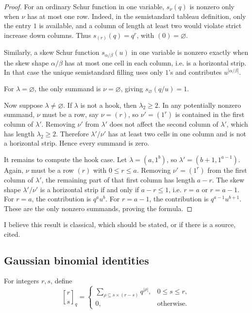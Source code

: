 \documentclass[12pt]{article}
\newcommand{\qbinom}[2]{\genfrac{[}{]}{0pt}{}{#1}{#2}_q}
\newcommand{\review}[1]{\begin{reviewbox}#1\end{reviewbox}}
\begin{document}
\begin{proof}
For an ordinary Schur function in one variable, \(s_\nu(q)\) is nonzero only when \(\nu\) has at most one row.  Indeed, in the semistandard tableau definition, only the entry \(1\) is available, and a column of length at least two would violate strict increase down columns.  Thus \(s_{(r)}(q)=q^r\), with \((0)=\varnothing\).

Similarly, a skew Schur function \(s_{\alpha/\beta}(u)\) in one variable is nonzero exactly when the skew shape \(\alpha/\beta\) has at most one cell in each column, i.e. is a horizontal strip.  In that case the unique semistandard filling uses only \(1\)'s and contributes \(u^{|\alpha/\beta|}\).

For \(\lambda=\varnothing\), the only summand is \(\nu=\varnothing\), giving \(s_{\varnothing}(q/u)=1\).

Now suppose \(\lambda\neq\varnothing\).  If \(\lambda\) is not a hook, then \(\lambda_2\ge 2\).  In any potentially nonzero summand, \(\nu\) must be a row, say \(\nu=(r)\), so \(\nu'=(1^r)\) is contained in the first column of \(\lambda'\).  Removing \(\nu'\) from \(\lambda'\) does not affect the second column of \(\lambda'\), which has length \(\lambda_2\ge 2\).  Therefore \(\lambda'/\nu'\) has at least two cells in one column and is not a horizontal strip.  Hence every summand is zero.

It remains to compute the hook case.  Let \(\lambda=(a,1^b)\), so \(\lambda'=(b+1,1^{a-1})\).  Again, \(\nu\) must be a row \((r)\) with \(0\le r\le a\).  Removing \(\nu'=(1^r)\) from the first column of \(\lambda'\), the remaining part of that first column has length \(a-r\).  The skew shape \(\lambda'/\nu'\) is a horizontal strip if and only if \(a-r\le 1\), i.e. \(r=a\) or \(r=a-1\).  For \(r=a\), the contribution is \(q^a u^b\).  For \(r=a-1\), the contribution is \(q^{a-1}u^{b+1}\).  These are the only nonzero summands, proving the formula.
\end{proof}

\review{I believe this result is classical, which should be stated, or if there is a source, cited.}

\subsection{Gaussian binomial identities}

For integers \(r,s\), define
\[
\qbinom{r}{s}
=
\begin{cases}
\displaystyle \sum_{\rho\subseteq s\times(r-s)}q^{|\rho|},
& 0\le s\le r,\\[1em]
0,
&\text{otherwise.}
\end{cases}
\]
\end{document}
